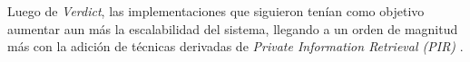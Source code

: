 Luego de \emph{Verdict}, las implementaciones que siguieron tenían como objetivo 
aumentar aun más la escalabilidad del sistema, llegando a un orden de magnitud más 
con la adición de técnicas derivadas de \emph{Private Information Retrieval (PIR)}
. 


